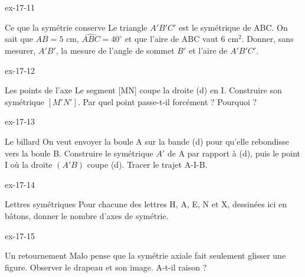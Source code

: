 \begin{blocLivre}{ex-17-11}\begin{exercice}[3]{Ce que la symétrie conserve}
Le triangle $A'B'C'$ est le symétrique de ABC. On sait que $AB=5$ cm, $\widehat{ABC}=40^\circ$ et que l’aire de ABC vaut 6 cm$^2$. Donner, sans mesurer, $A'B'$, la mesure de l’angle de sommet $B'$ et l’aire de $A'B'C'$.
\label{fig-ex-17-11}
\end{exercice}\end{blocLivre}
\begin{blocLivre}{ex-17-12}\begin{exercice}[3]{Les points de l’axe}
Le segment [MN] coupe la droite (d) en I. Construire son symétrique $[M'N']$. Par quel point passe-t-il forcément ? Pourquoi ?
\label{fig-ex-17-12}
\end{exercice}\end{blocLivre}
\begin{blocLivre}{ex-17-13}\begin{exercice}[3]{Le billard}
On veut envoyer la boule A sur la bande (d) pour qu’elle rebondisse vers la boule B. Construire le symétrique $A'$ de A par rapport à (d), puis le point I où la droite $(A'B)$ coupe (d). Tracer le trajet A-I-B.
\label{fig-ex-17-13}
\end{exercice}\end{blocLivre}
\begin{blocLivre}{ex-17-14}\begin{exercice}[3]{Lettres symétriques}
Pour chacune des lettres H, A, E, N et X, dessinées ici en bâtons, donner le nombre d’axes de symétrie.
\label{fig-ex-17-14}
\end{exercice}\end{blocLivre}
\begin{blocLivre}{ex-17-15}\begin{exercice}[3]{Un retournement}
Malo pense que la symétrie axiale fait seulement glisser une figure. Observer le drapeau et son image. A-t-il raison ?
\label{fig-ex-17-15}
\end{exercice}\end{blocLivre}

\clearpage
